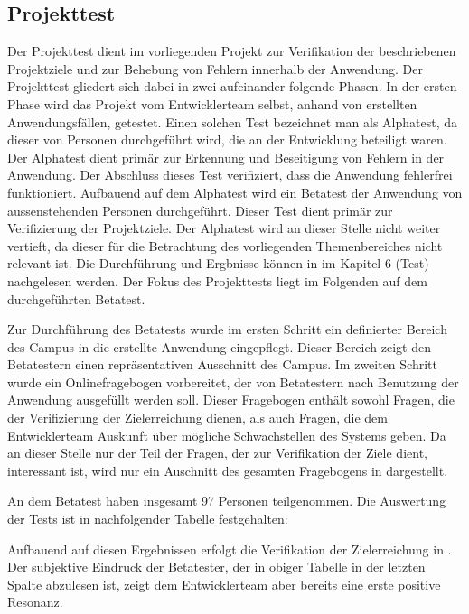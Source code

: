 \subsection{Projekttest}
\label{sec:Projekttest}

Der Projekttest dient im vorliegenden Projekt zur Verifikation der beschriebenen
Projektziele und zur Behebung von Fehlern innerhalb der Anwendung. Der
Projekttest gliedert sich dabei in zwei aufeinander folgende Phasen. In der
ersten Phase wird das Projekt vom Entwicklerteam selbst, anhand von erstellten
Anwendungsfällen, getestet. Einen solchen Test bezeichnet man als Alphatest, da
dieser von Personen durchgeführt wird, die an der Entwicklung beteiligt waren.
Der Alphatest dient primär zur Erkennung und Beseitigung von Fehlern in der
Anwendung. Der Abschluss dieses Test verifiziert, dass die Anwendung fehlerfrei
funktioniert. Aufbauend auf dem Alphatest wird ein Betatest der Anwendung von
aussenstehenden Personen durchgeführt. Dieser Test dient primär zur
Verifizierung der Projektziele. Der Alphatest wird an dieser Stelle nicht weiter
vertieft, da dieser für die Betrachtung des vorliegenden Themenbereiches nicht
relevant ist. Die Durchführung und Ergbnisse können in
\citet{modelierungUndBetrieb2014} im Kapitel 6 (Test) nachgelesen werden. Der
Fokus des Projekttests liegt im Folgenden auf dem durchgeführten Betatest.

Zur Durchführung des Betatests wurde im ersten Schritt ein definierter Bereich
des Campus in die erstellte Anwendung eingepflegt. Dieser Bereich zeigt den
Betatestern einen repräsentativen Ausschnitt des Campus.
Im zweiten Schritt wurde ein Onlinefragebogen vorbereitet, der von Betatestern
nach Benutzung der Anwendung ausgefüllt werden soll. Dieser Fragebogen enthält 
sowohl Fragen, die der Verifizierung der Zielerreichung dienen, als auch
Fragen, die dem Entwicklerteam Auskunft über mögliche Schwachstellen des Systems geben.
Da an dieser Stelle nur der Teil der Fragen, der zur Verifikation der Ziele dient,
interessant ist, wird nur ein Auschnitt des gesamten Fragebogens in  dargestellt.

An dem Betatest haben insgesamt 97 Personen teilgenommen. Die Auswertung der Tests ist in nachfolgender Tabelle
festgehalten:

\clearpage
{}

Aufbauend auf diesen Ergebnissen erfolgt die Verifikation der Zielerreichung in .
Der subjektive Eindruck der Betatester, der in obiger Tabelle in der letzten Spalte abzulesen ist,
zeigt dem Entwicklerteam aber bereits eine erste positive Resonanz.